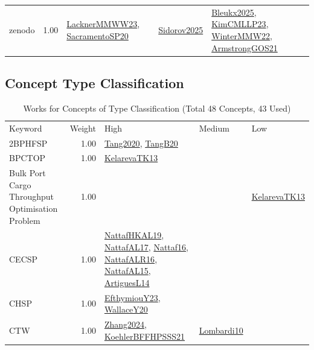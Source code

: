 {\begin{longtable}{p{3cm}r>{\raggedright\arraybackslash}p{6cm}>{\raggedright\arraybackslash}p{6cm}>{\raggedright\arraybackslash}p{8cm}}
\index{zenodo}\index{Benchmarks!zenodo}zenodo &  1.00 & \hyperref[detail:LacknerMMWW23]{LacknerMMWW23}, \hyperref[detail:SacramentoSP20]{SacramentoSP20} & \hyperref[detail:Sidorov2025]{Sidorov2025} & \hyperref[detail:Bleukx2025]{Bleukx2025}, \hyperref[detail:KimCMLLP23]{KimCMLLP23}, \hyperref[detail:WinterMMW22]{WinterMMW22}, \hyperref[detail:ArmstrongGOS21]{ArmstrongGOS21}\\
\end{longtable}
}

\clearpage
\subsection{Concept Type Classification}
\label{sec:Classification}
\label{Classification}
{\scriptsize
\begin{longtable}{p{3cm}r>{\raggedright\arraybackslash}p{6cm}>{\raggedright\arraybackslash}p{6cm}>{\raggedright\arraybackslash}p{8cm}}
\rowcolor{white}\caption{Works for Concepts of Type Classification (Total 48 Concepts, 43 Used)}\\ \toprule
\rowcolor{white}Keyword & Weight & High & Medium & Low\\ \midrule\endhead
\bottomrule
\endfoot
\index{2BPHFSP}\index{Classification!2BPHFSP}2BPHFSP &  1.00 & \hyperref[detail:Tang2020]{Tang2020}, \hyperref[detail:TangB20]{TangB20} &  & \\
\index{BPCTOP}\index{Classification!BPCTOP}BPCTOP &  1.00 & \hyperref[detail:KelarevaTK13]{KelarevaTK13} &  & \\
\index{Bulk Port Cargo Throughput Optimisation Problem}\index{Classification!Bulk Port Cargo Throughput Optimisation Problem}Bulk Port Cargo Throughput Optimisation Problem &  1.00 &  &  & \hyperref[detail:KelarevaTK13]{KelarevaTK13}\\
\index{CECSP}\index{Classification!CECSP}CECSP &  1.00 & \hyperref[detail:NattafHKAL19]{NattafHKAL19}, \hyperref[detail:NattafAL17]{NattafAL17}, \hyperref[detail:Nattaf16]{Nattaf16}, \hyperref[detail:NattafALR16]{NattafALR16}, \hyperref[detail:NattafAL15]{NattafAL15}, \hyperref[detail:ArtiguesL14]{ArtiguesL14} &  & \\
\index{CHSP}\index{Classification!CHSP}CHSP &  1.00 & \hyperref[detail:EfthymiouY23]{EfthymiouY23}, \hyperref[detail:WallaceY20]{WallaceY20} &  & \\
\index{CTW}\index{Classification!CTW}CTW &  1.00 & \hyperref[detail:Zhang2024]{Zhang2024}, \hyperref[detail:KoehlerBFFHPSSS21]{KoehlerBFFHPSSS21} & \hyperref[detail:Lombardi10]{Lombardi10} & \\

\end{longtable}}
